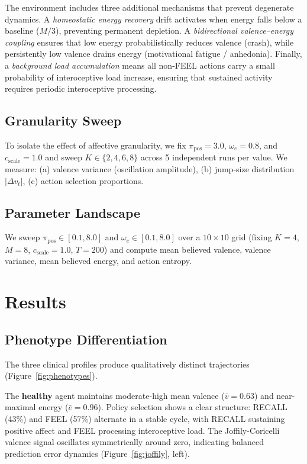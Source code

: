 \documentclass[11pt,a4paper]{article}
\begin{document}
The environment includes three additional mechanisms that prevent degenerate dynamics. A \emph{homeostatic energy recovery} drift activates when energy falls below a baseline ($M/3$), preventing permanent depletion. A \emph{bidirectional valence--energy coupling} ensures that low energy probabilistically reduces valence (crash), while persistently low valence drains energy (motivational fatigue / anhedonia). Finally, a \emph{background load accumulation} means all non-FEEL actions carry a small probability of interoceptive load increase, ensuring that sustained activity requires periodic interoceptive processing.

\subsection{Granularity Sweep}

To isolate the effect of affective granularity, we fix $\pi_{\text{pos}} = 3.0$, $\omega_e = 0.8$, and $c_{\text{scale}} = 1.0$ and sweep $K \in \{2, 4, 6, 8\}$ across 5 independent runs per value. We measure: (a) valence variance (oscillation amplitude), (b) jump-size distribution $|\Delta v_t|$, (c) action selection proportions.

\subsection{Parameter Landscape}

We sweep $\pi_{\text{pos}} \in [0.1, 8.0]$ and $\omega_e \in [0.1, 8.0]$ over a $10 \times 10$ grid (fixing $K{=}4$, $M{=}8$, $c_{\text{scale}} = 1.0$, $T{=}200$) and compute mean believed valence, valence variance, mean believed energy, and action entropy.


\section{Results}\label{sec:results}

\subsection{Phenotype Differentiation}

The three clinical profiles produce qualitatively distinct trajectories (Figure~\ref{fig:phenotypes}).

The \textbf{healthy} agent maintains moderate-high mean valence ($\bar{v} = 0.63$) and near-maximal energy ($\bar{e} = 0.96$). Policy selection shows a clear structure: RECALL (43\%) and FEEL (57\%) alternate in a stable cycle, with RECALL sustaining positive affect and FEEL processing interoceptive load. The Joffily-Coricelli valence signal oscillates symmetrically around zero, indicating balanced prediction error dynamics (Figure~\ref{fig:joffily}, left).
\end{document}
